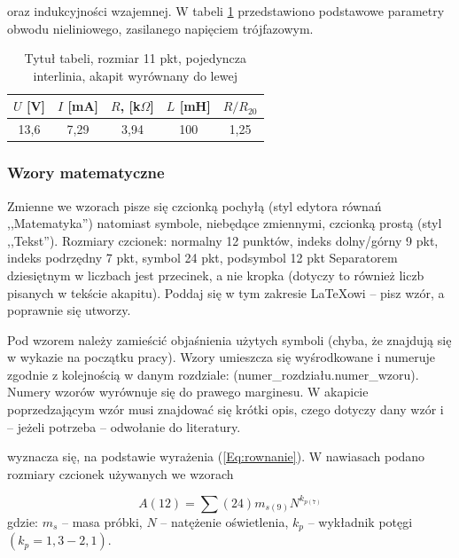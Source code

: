 \documentclass[12pt,twoside,openright]{article}
\begin{document}
\begin{example}
[\ldots] oraz indukcyjności wzajemnej. W tabeli \ref{Tab:tabela} przedstawiono podstawowe parametry obwodu nieliniowego, zasilanego napięciem trójfazowym.
\end{example}

\begin{table}[ht]
\caption{Tytuł tabeli, rozmiar 11 pkt, pojedyncza interlinia, akapit wyrównany do lewej}
\centering		
	\begin{tabular}{|c|c|c|c|c|}	
		\hline
		$U$ [V] & $I$ [mA] & $R$, [k$\Omega$] & $L$ [mH] & $R/R_{20}$ \\
		\hline
		13,6 & 7,29 & 3,94 & 100 & 1,25 \\
		\hline
	\end{tabular}	
	
\label{Tab:tabela}
\end{table}	

\subsubsection{Wzory matematyczne}

Zmienne we wzorach pisze się czcionką pochyłą (styl edytora równań ,,Matematyka'') natomiast symbole, niebędące zmiennymi, czcionką prostą (styl ,,Tekst'').
Rozmiary czcionek: normalny 12 punktów, indeks dolny/górny 9 pkt, indeks podrzędny 7 pkt, symbol 24 pkt, podsymbol 12 pkt Separatorem dziesiętnym w liczbach jest
przecinek, a nie kropka (dotyczy to również liczb pisanych w tekście akapitu). Poddaj się w tym zakresie \LaTeX{}owi -- pisz wzór, a poprawnie się utworzy.


Pod wzorem należy zamieścić objaśnienia użytych symboli (chyba, że znajdują się w wykazie na początku pracy). Wzory umieszcza się wyśrodkowane i numeruje zgodnie
z kolejnością w danym rozdziale: (numer\_rozdziału.numer\_wzoru). Numery wzorów wyrównuje się do prawego marginesu. W akapicie poprzedzającym wzór musi znajdować się krótki opis, czego dotyczy dany wzór i -- jeżeli potrzeba -- odwołanie do literatury.

\begin{example}
[\ldots] wyznacza się, na podstawie wyrażenia (\ref{Eq:rownanie}). W nawiasach podano rozmiary czcionek używanych we wzorach
\end{example}

\begin{equation}
A(12)={\sum}(24)m_{s(9)}N^{k_{p(7)}}
\label{Eq:rownanie}
\end{equation}
gdzie: $m_s$ -- masa próbki, $N$ -- natężenie oświetlenia, $k_p$ -- wykładnik potęgi $(k_p=1,3-2,1)$.\\
\end{document}
